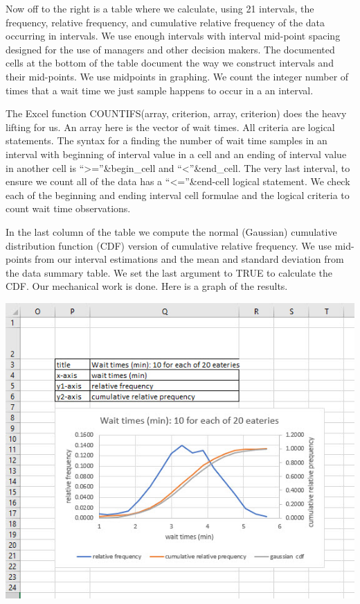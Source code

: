 \documentclass[
]{book}
\begin{document}
Now off to the right is a table where we calculate, using 21 intervals, the frequency, relative frequency, and cumulative relative frequency of the data occurring in intervals. We use enough intervals with interval mid-point spacing designed for the use of managers and other decision makers. The documented cells at the bottom of the table document the way we construct intervals and their mid-points. We use midpoints in graphing. We count the integer number of times that a wait time we just sample happens to occur in a an interval.

The Excel function COUNTIFS(array, criterion, array, criterion) does the heavy lifting for us. An array here is the vector of wait times. All criteria are logical statements. The syntax for a finding the number of wait time samples in an interval with beginning of interval value in a cell and an ending of interval value in another cell is ``\textgreater=''\&begin\_cell and ``\textless{}''\&end\_cell. The very last interval, to ensure we count all of the data has a ``\textless=''\&end-cell logical statement. We check each of the beginning and ending interval cell formulae and the logical criteria to count wait time observations.

In the last column of the table we compute the normal (Gaussian) cumulative distribution function (CDF) version of cumulative relative frequency. We use mid-points from our interval estimations and the mean and standard deviation from the data summary table. We set the last argument to TRUE to calculate the CDF. Our mechanical work is done. Here is a graph of the results.

\includegraphics{images/05/eatery-eda-graph.jpg}
\end{document}
